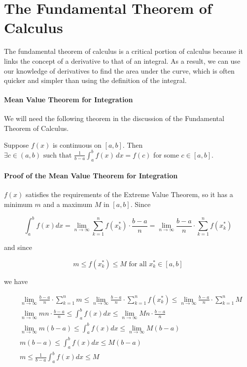 \section{The Fundamental Theorem of Calculus}
\label{sec:the-fundamental-theorem-of-calculus}

The fundamental theorem of calculus is a critical portion of calculus because it links the concept of a derivative to that of an integral. As a result, we can use our knowledge of derivatives to find the area under the curve, which is often quicker and simpler than using the definition of the integral.

\paragraph{Mean Value Theorem for Integration}

We will need the following theorem in the discussion of the Fundamental Theorem of Calculus.

Suppose $f(x)$ is continuous on $[a,b]$. Then $\exists c \in (a,b) \text{ such that } 
\frac{1}{b-a}\int_a^b f(x)\,dx = f(c)$ for some $c \in [a,b]$.

\paragraph{Proof of the Mean Value Theorem for Integration}

$f(x)$ satisfies the requirements of the Extreme Value Theorem, so it has a minimum $m$ and a maximum $M$ in $[a,b]$. Since

$$\int_a^b f(x)dx = \lim_{n \to \infty} \sum_{k=1}^n f(x_k^\ast) \cdot \frac{b-a}{n} = \lim_{n \to \infty} \frac{b-a}{n} \cdot \sum_{k=1}^n f(x_k^\ast)$$

and since

$$m \le f(x_k^\ast) \le M \text{ for all } x_k^\ast \in [a,b]$$

we have

\begin{align}
&\lim_{n \to \infty} \frac{b-a}{n} \cdot \sum_{k=1}^n m \le \lim_{n \to \infty} \frac{b-a}{n} \cdot \sum_{k=1}^n f(x_k^*) \le \lim_{n \to \infty} \frac{b-a}{n} \cdot \sum_{k=1}^n M \\
&\lim_{n \to \infty} mn \cdot \frac{b-a}{n} \le \int_a^b f(x)dx \le \lim_{n \to \infty} Mn \cdot \frac{b-a}{n} \\
&\lim_{n \to \infty} m(b-a) \le \int_a^b f(x)dx \le \lim_{n \to \infty} M(b-a) \\
&m(b-a) \le \int_a^b f(x)dx \le M(b-a) \\
&m \le \frac{1}{b-a} \int_a^b f(x)dx \le M
\end{align}

